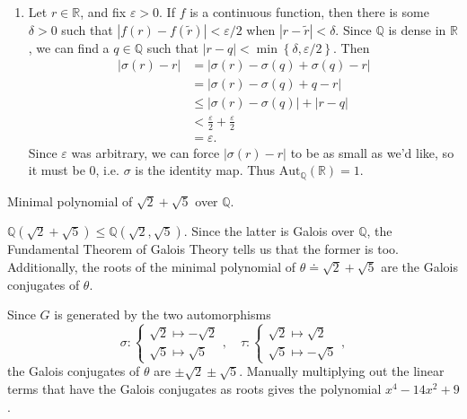 \documentclass[10pt]{report}
\begin{document}
\begin{enumerate}
	\item Let $r \in \mathbb{R}$, and fix $\varepsilon>0$. If $f$ is a continuous function, then there is some $\delta>0$ such that $|f(r)-f(\tilde{r})|<\varepsilon/2$ when $|r-\tilde{r}|<\delta$. Since $\mathbb{Q}$ is dense in $\mathbb{R}$, we can find a $q \in \mathbb{Q}$ such that $|r-q| < \min \left\{ \delta,\varepsilon/2 \right\}$. Then
		\begin{align*}
			|\sigma(r)-r| &= |\sigma(r)-\sigma(q)+\sigma(q)-r| \\
				      &= |\sigma(r)-\sigma(q)+q-r| \\
				      &\leq |\sigma(r)-\sigma(q)| + |r-q| \\
				      &< \frac{\varepsilon}{2} + \frac{\varepsilon}{2} \\
				      &= \varepsilon.
		\end{align*}
		Since $\varepsilon$ was arbitrary, we can force $|\sigma(r)-r|$ to be as small as we'd like, so it must be 0, i.e. $\sigma$ is the identity map. Thus $\text{Aut}_{\mathbb{Q}}(\mathbb{R})=1$.
\end{enumerate}

\begin{exer}[DF 14.2: 1]
Minimal polynomial of $\sqrt{2} +\sqrt{5} $ over $\mathbb{Q}$.
\end{exer}
$\mathbb{Q}(\sqrt{2} +\sqrt{5} ) \leq \mathbb{Q}(\sqrt{2} ,\sqrt{5} )$. Since the latter is Galois over $\mathbb{Q}$, the Fundamental Theorem of Galois Theory tells us that the former is too. Additionally, the roots of the minimal polynomial of $\theta \doteq \sqrt{2} +\sqrt{5} $ are the Galois conjugates of $\theta$.

Since $G$ is generated by the two automorphisms
\[
\sigma :
\begin{cases}
	\sqrt{2} \mapsto -\sqrt{2} \\
	\sqrt{5} \mapsto \sqrt{5} 
\end{cases} ,\quad
\tau:
\begin{cases}
	\sqrt{2} \mapsto \sqrt{2} \\
        \sqrt{5} \mapsto -\sqrt{5}
\end{cases},
\] the Galois conjugates of $\theta$ are $\pm \sqrt{2} \pm \sqrt{5} $. Manually multiplying out the linear terms that have the Galois conjugates as roots gives the polynomial $x^4-14x^2+9$.
\end{document}
